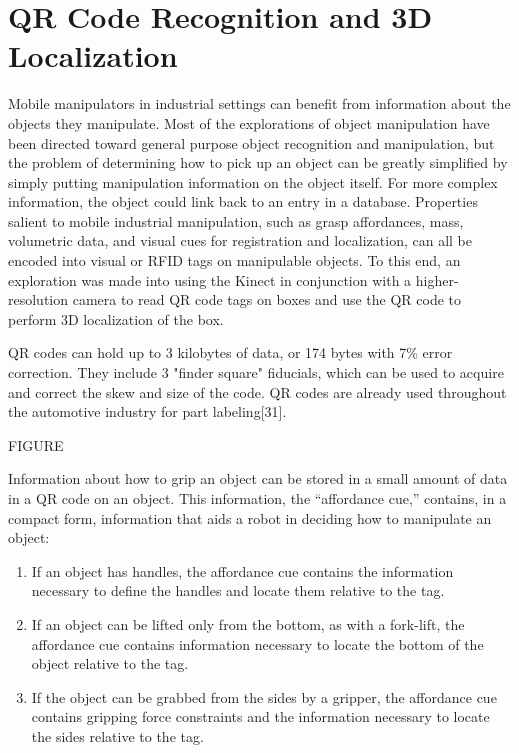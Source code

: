 \documentclass[]{cwru} %
\begin{document}
\section{QR Code Recognition and 3D Localization}

Mobile manipulators in industrial settings can benefit from information
about the objects they manipulate. Most of the explorations of object
manipulation have been directed toward general purpose object
recognition and manipulation, but the problem of determining how to pick
up an object can be greatly simplified by simply putting manipulation
information on the object itself. For more complex information, the
object could link back to an entry in a database. Properties salient to
mobile industrial manipulation, such as grasp affordances, mass,
volumetric data, and visual cues for registration and localization, can
all be encoded into visual or RFID tags on manipulable objects. To this
end, an exploration was made into using the Kinect in conjunction with a
higher-resolution camera to read QR code tags on boxes and use the QR
code to perform 3D localization of the box.

QR codes can hold up to 3 kilobytes of data, or 174 bytes with 7\% error
correction. They include 3 "finder square" fiducials, which can be used
to acquire and correct the skew and size of the code. QR codes are
already used throughout the automotive industry for part
labeling{[}31{]}.

FIGURE

Information about how to grip an object can be stored in a small amount
of data in a QR code on an object. This information, the ``affordance
cue,'' contains, in a compact form, information that aids a robot in
deciding how to manipulate an object:

\begin{enumerate}
\def\labelenumi{\arabic{enumi}.}
\item
  If an object has handles, the affordance cue contains the information
  necessary to define the handles and locate them relative to the tag.
\item
  If an object can be lifted only from the bottom, as with a fork-lift,
  the affordance cue contains information necessary to locate the bottom
  of the object relative to the tag.
\item
  If the object can be grabbed from the sides by a gripper, the
  affordance cue contains gripping force constraints and the information
  necessary to locate the sides relative to the tag.
\end{enumerate}
\end{document}
